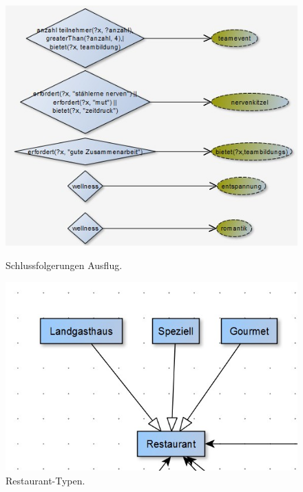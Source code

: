 \begin{figure}[H]%
    \begin{minipage}[hbt]{0,49\textwidth}
        \centering
        \includegraphics[scale=0.3]{bilder/AufbauAusflug.jpg}
        \caption{Schlussfolgerungen Ausflug.\label{fig:AufbauAusflug}\protect\footnotemark}
    \end{minipage}
    \begin{minipage}[hbt]{0,49\textwidth}
        \centering
        \includegraphics[scale=0.3]{bilder/AufbauRest.jpg}
        \caption{Restaurant-Typen.\label{fig:AufbauRest}\protect\footnotemark[4]}
    \end{minipage}
\end{figure}

